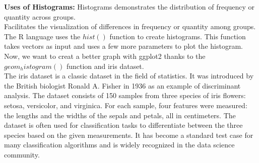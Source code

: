 \documentclass{article}\usepackage[]{graphicx}\usepackage[]{xcolor}
\begin{document}
\textbf{Uses of Histograms:}
Histograms demonstrates the distribution of frequency or quantity across groups.\\
Facilitates the visualization of differences in frequency or quantity among groups.\\
The R language uses the $hist()$ function to create histograms. This function takes vectors as input and uses a few more parameters to plot the histogram.\\
Now, we want to creat a better graph with ggplot2 thanks to the $geom_histogram()$ function and iris dataset.\\
The iris dataset is a classic dataset in the field of statistics. It was introduced by the British biologist Ronald A. Fisher in 1936 as an example of discriminant analysis. The dataset consists of 150 samples from three species of iris flowers: setosa, versicolor, and virginica. For each sample, four features were measured: the lengths and the widths of the sepals and petals, all in centimeters. The dataset is often used for classification tasks to differentiate between the three species based on the given measurements. It has become a standard test case for many classification algorithms and is widely recognized in the data science community.\\
\end{document}

